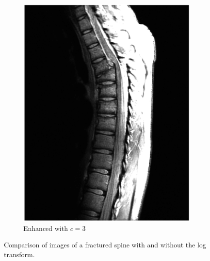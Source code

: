 \begin{figure}[!Htb]
\begin{subfigure}[b]{0.32\linewidth}
  \includegraphics[width=\textwidth]{breukOokMooi.eps}
  \caption{Enhanced with \(c=3\)}
  \label{fig:withMoreEnhancement}
 \end{subfigure}
 \caption{Comparison of images of a fractured spine with and without the log transform.}
\end{figure}
\clearpage